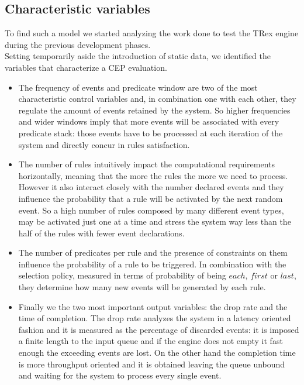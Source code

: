 \subsection{Characteristic variables}
To find such a model we started analyzing the work done to test the TRex engine during the previous development phases.\\
Setting temporarily aside the introduction of static data, we identified the variables that characterize a CEP evaluation.
\begin{itemize}
\item The frequency of events and predicate window are two of the most characteristic control variables and, in combination one with each other, they regulate the amount of events retained by the system. So higher frequencies and wider windows imply that more events will be associated with every predicate stack: those events have to be processed at each iteration of the system and directly concur in rules satisfaction.
\item The number of rules intuitively impact the computational requirements horizontally, meaning that the more the rules the more we need to process. However it also interact closely with the number declared events and they influence the probability that a rule will be activated by the next random event. So a high number of rules composed by many different event types, may be activated just one at a time and stress the system way less than the half of the rules with fewer event declarations.
\item The number of predicates per rule and the presence of constraints on them influence the probability of a rule to be triggered. In combination with the selection policy, measured in terms of probability of being $each$, $first$ or $last$, they determine how many new events will be generated by each rule.
\item Finally we the two most important output variables: the drop rate and the time of completion. The drop rate analyzes the system in a latency oriented fashion and it is measured as the percentage of discarded events: it is imposed a finite length to the input queue and if the engine does not empty it fast enough the exceeding events are lost. On the other hand the completion time is more throughput oriented and it is obtained leaving the queue unbound and waiting for the system to process every single event.
\end{itemize}

